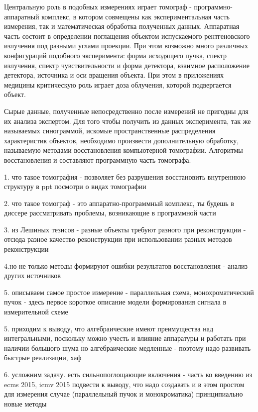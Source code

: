 Центральную роль в подобных измерениях играет томограф - программно-аппаратный комплекс, в котором совмещены как экспериментальная часть измерения, так и математическая обработка полученных данных.
Аппаратная часть состоит в определении поглащения объектом испускаемого рентгеновского излучения под разными углами проекции.
При этом возможно много различных конфигураций подобного эксперимента: форма исходящего пучка, спектр излучения, спектр чувствительности и форма детектора, взаимное расположение детектора, источника и оси вращения объекта.
При этом в приложениях медицины критическую роль играет доза облучения, которой подвергается объект.

Сырые данные, полученные непосредственно после измерений не пригодны для их анализа экспертом.
Для того чтобы получить из данных эксперимента, так же называемых синограммой, искомые пространственные распределения характеристик объектов, необходимо произвести дополнительную обработку, называемую методами восстановления компьютерной томографии.
Алгоритмы восстановления и составляют программную часть томографа.



1. что такое томография - позволяет без разрушения восстановить внутреннюю структуру в ppt посмотри о видах томографии	

2. что такое томограф - это аппаратно-программный комплекс, ты будешь в диссере рассматривать проблемы, возникающие в программной части

3. из Лешиных тезисов - разные объекты требуют разного при реконструкции - отсюда разное качество реконструкции при использовании разных методов реконструкции

4.но не только методы формируют ошибки результатов восстановления - анализ других источников

5. описываем самое простое измерение - параллельная схема, монохроматический пучок - здесь первое короткое описание модели формирования сигнала в измерительной схеме

5. приходим к выводу, что алгебраические имеют преимущества над интегральными, поскольку можно учесть и влияние аппаратуры и работать при наличии большого шума
но алгебраические медленные - поэтому надо развивать быстрые реализации, хаф

6. усложним задачу. есть сильнопоглощающие включения - часть ко введению из ecms 2015, icmv 2015 подвести к выводу, что надо создавать и в этом простом для измерения случае (параллельный пучок и монохроматика) принципиально новые методы


